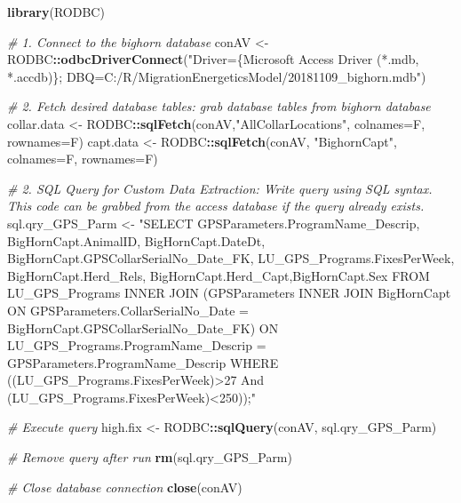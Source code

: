 \documentclass[
]{book}
\newenvironment{Shaded}{\begin{snugshade}}{\end{snugshade}}
\newcommand{\AttributeTok}[1]{\textcolor[rgb]{0.13,0.29,0.53}{#1}}
\newcommand{\CommentTok}[1]{\textcolor[rgb]{0.56,0.35,0.01}{\textit{#1}}}
\newcommand{\FunctionTok}[1]{\textcolor[rgb]{0.13,0.29,0.53}{\textbf{#1}}}
\newcommand{\NormalTok}[1]{#1}
\newcommand{\OtherTok}[1]{\textcolor[rgb]{0.56,0.35,0.01}{#1}}
\newcommand{\SpecialCharTok}[1]{\textcolor[rgb]{0.81,0.36,0.00}{\textbf{#1}}}
\newcommand{\StringTok}[1]{\textcolor[rgb]{0.31,0.60,0.02}{#1}}
\begin{document}
\begin{Shaded}
\begin{Highlighting}[]
\FunctionTok{library}\NormalTok{(RODBC)}

\CommentTok{\# 1. Connect to the bighorn database}
\NormalTok{conAV }\OtherTok{\textless{}{-}}\NormalTok{ RODBC}\SpecialCharTok{::}\FunctionTok{odbcDriverConnect}\NormalTok{(}\StringTok{"Driver=\{Microsoft Access Driver (*.mdb, *.accdb)\};}
\StringTok{                                DBQ=C:/R/MigrationEnergeticsModel/20181109\_bighorn.mdb"}\NormalTok{)}

\CommentTok{\# 2. Fetch desired database tables: grab database tables from bighorn database}
\NormalTok{collar.data }\OtherTok{\textless{}{-}}\NormalTok{ RODBC}\SpecialCharTok{::}\FunctionTok{sqlFetch}\NormalTok{(conAV,}\StringTok{"AllCollarLocations"}\NormalTok{, }\AttributeTok{colnames=}\NormalTok{F, }\AttributeTok{rownames=}\NormalTok{F)}
\NormalTok{capt.data }\OtherTok{\textless{}{-}}\NormalTok{ RODBC}\SpecialCharTok{::}\FunctionTok{sqlFetch}\NormalTok{(conAV, }\StringTok{"BighornCapt"}\NormalTok{, }\AttributeTok{colnames=}\NormalTok{F, }\AttributeTok{rownames=}\NormalTok{F)}

\CommentTok{\# 2. SQL Query for Custom Data Extraction: Write query using SQL syntax. This code can be grabbed from the access database if the query already exists.}
\NormalTok{sql.qry\_GPS\_Parm }\OtherTok{\textless{}{-}} \StringTok{"SELECT GPSParameters.ProgramName\_Descrip, BigHornCapt.AnimalID, BigHornCapt.DateDt, BigHornCapt.GPSCollarSerialNo\_Date\_FK,}
\StringTok{  LU\_GPS\_Programs.FixesPerWeek, BigHornCapt.Herd\_Rels, BigHornCapt.Herd\_Capt,BigHornCapt.Sex}
\StringTok{                FROM LU\_GPS\_Programs INNER JOIN (GPSParameters INNER JOIN BigHornCapt ON}
\StringTok{  GPSParameters.CollarSerialNo\_Date = BigHornCapt.GPSCollarSerialNo\_Date\_FK) ON}
\StringTok{  LU\_GPS\_Programs.ProgramName\_Descrip = GPSParameters.ProgramName\_Descrip}
\StringTok{                WHERE ((LU\_GPS\_Programs.FixesPerWeek)\textgreater{}27 And (LU\_GPS\_Programs.FixesPerWeek)\textless{}250));"}

\CommentTok{\# Execute query}
\NormalTok{high.fix }\OtherTok{\textless{}{-}}\NormalTok{ RODBC}\SpecialCharTok{::}\FunctionTok{sqlQuery}\NormalTok{(conAV, sql.qry\_GPS\_Parm)}

\CommentTok{\# Remove query after run}
\FunctionTok{rm}\NormalTok{(sql.qry\_GPS\_Parm)  }
 
\CommentTok{\# Close database connection}
\FunctionTok{close}\NormalTok{(conAV) }
\end{Highlighting}
\end{Shaded}
\end{document}
